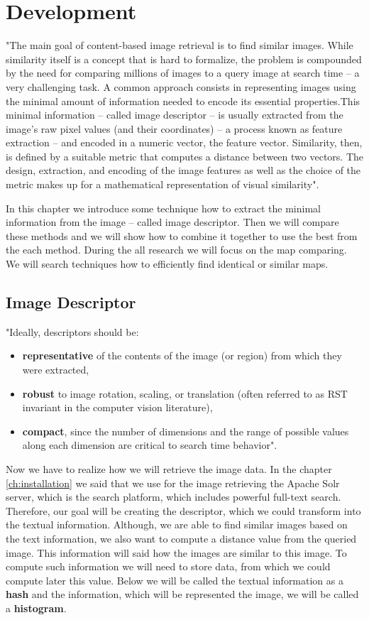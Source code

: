\documentclass[12pt,a4paper]{report}
\begin{document}
\chapter{Development}
"The main goal of content-based image retrieval is to find similar images. While similarity itself is a
concept that is hard to formalize, the problem is compounded by the need for comparing millions
of images to a query image at search time -- a very challenging task. A common approach consists
in representing images using the minimal amount of information needed to encode its essential
properties.This minimal information -- called image descriptor -- is usually extracted from the image’s
raw pixel values (and their coordinates) -- a process known as feature extraction -- and encoded in a
numeric vector, the feature vector. Similarity, then, is defined by a suitable metric that computes a
distance between two vectors. The design, extraction, and encoding of the image features as well as
the choice of the metric makes up for a mathematical representation of visual similarity"\cite[s. 30]{VIRbook}.

In this chapter we introduce some technique how to extract the minimal information from the image -- called image descriptor. Then we will compare these methods and we will show how to combine it together to use the best from the each method. During the all research we will focus on the map comparing. We will search techniques how to efficiently find identical or similar maps.

\section{Image Descriptor}

"Ideally, descriptors should be:
\begin{itemize}
\item \textbf{representative} of the contents of the image (or region) from which they were extracted,
\item \textbf{robust} to image rotation, scaling, or translation (often referred to as RST invariant in the computer vision literature),
\item \textbf{compact}, since the number of dimensions and the range of possible values along each dimension are critical to search time behavior"\cite[s.~30]{VIRbook}.
\end{itemize}

Now we have to realize how we will retrieve the image data. In the chapter \ref{ch:installation} we said that we use for the image retrieving the Apache Solr server, which is the search platform, which includes powerful full-text search. Therefore, our goal will be creating the descriptor, which we could transform into the textual information. Although, we are able to find similar images based on the text information, we also want to compute a distance value from the queried image. This information will said how the images are similar to this image. To compute such information we will need to store data, from which we could compute later this value. Below we will be called the textual information as a \textbf{hash} and the information, which will be represented the image, we will be called a \textbf{histogram}.
\end{document}
